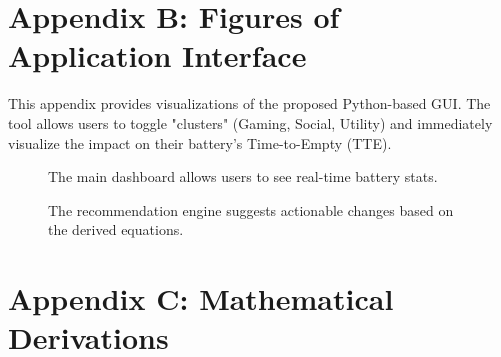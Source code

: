 \documentclass[12pt]{article}
\begin{document}
\newpage

\section{Appendix B: Figures of Application Interface}

This appendix provides visualizations of the proposed Python-based GUI. The tool allows users to toggle "clusters" (Gaming, Social, Utility) and immediately visualize the impact on their battery's Time-to-Empty (TTE).

\begin{figure}[h]
    \centering
    \caption{The main dashboard allows users to see real-time battery stats.}
\end{figure}

\begin{figure}[h]
    \centering
    \caption{The recommendation engine suggests actionable changes based on the derived equations.}
\end{figure}

\newpage

\section{Appendix C: Mathematical Derivations}
\end{document}
